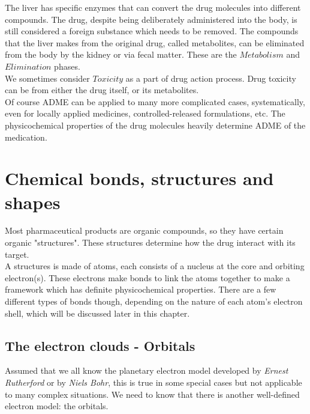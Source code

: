 \documentclass{report}
\begin{document}
		The liver has specific enzymes that can convert the drug molecules into different compounds. The drug, despite being deliberately administered into the body, is still considered a foreign substance which needs to be removed. The compounds that the liver makes from the original drug, called metabolites, can be eliminated from the body by the kidney or via fecal matter. These are the $Metabolism$ and $Elimination$ phases. \\
		
		We sometimes consider $Toxicity$ as a part of drug action process. Drug toxicity can be from either the drug itself, or its metabolites. \\
		
		Of course ADME can be applied to many more complicated cases, systematically, even for locally applied medicines, controlled-released formulations, etc. The physicochemical properties of the drug molecules heavily determine ADME of the medication. \\

\newpage

\section{Chemical bonds, structures and shapes}
	Most pharmaceutical products are organic compounds, so they have certain organic "structures". These structures determine how the drug interact with its target. \\
	
	A structures is made of atoms, each consists of a nucleus at the core and orbiting electron(s). These electrons make bonds to link the atoms together to make a framework which has definite physicochemical properties. There are a few different types of bonds though, depending on the nature of each atom's electron shell, which will be discussed later in this chapter. \\
	
	\subsection{The electron clouds - Orbitals}
		Assumed that we all know the planetary electron model developed by \textit{Ernest Rutherford} or by \textit{Niels Bohr}, this is true in some special cases but not applicable to many complex situations. We need to know that there is another well-defined electron model: the orbitals. \\
		
\end{document}
